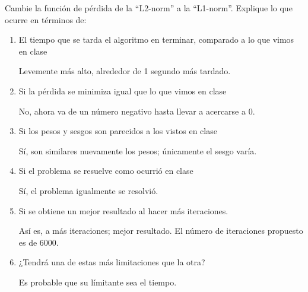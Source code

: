 \begin{problema}
	Cambie la función de pérdida de la “L2-norm” a la “L1-norm”.  Explique lo que ocurre en términos de:
	
	\begin{enumerate}
		\item El tiempo que se tarda el algoritmo en terminar, comparado a lo que vimos en clase
		\begin{sol}
			Levemente más alto, alrededor de 1 segundo más tardado. 
		\end{sol}
		\item Si la pérdida se minimiza igual que lo que vimos en clase
		\begin{sol}
			No, ahora va de un número negativo hasta llevar a acercarse a 0. 
		\end{sol}
		\item Si los pesos y sesgos son parecidos a los vistos en clase
		\begin{sol}
			Sí, son similares nuevamente los pesos; únicamente el sesgo varía. 
		\end{sol}
		\item Si el problema se resuelve como ocurrió en clase
		\begin{sol}
			Sí, el problema igualmente se resolvió.
		\end{sol}
		 \item Si se obtiene un mejor resultado al hacer más iteraciones.
		 \begin{sol}
		 	Así es, a más iteraciones; mejor resultado. El número de iteraciones propuesto es de 6000. 
		 \end{sol}
		 \item  ¿Tendrá una de estas más limitaciones que la otra? 
		 \begin{sol}
		 	Es probable que su límitante sea el tiempo.
		 \end{sol}
	\end{enumerate}
\end{problema}

